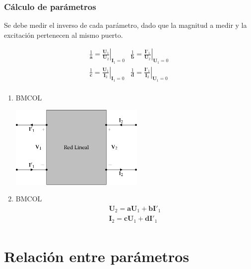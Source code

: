 \subsubsection{Cálculo de parámetros}
\label{sec:org67b01c0}
Se debe medir el inverso de cada parámetro, dado que la magnitud a medir y la excitación pertenecen al mismo puerto.

\renewcommand{\arraystretch}{3}
\[
  \begin{array}{cc}
    \frac{1}{\mathbf{a}} = \left.\frac{\mathbf{U}_1}{\mathbf{U}_2}\right\rvert_{\mathbf{I}_1 = 0} &
    \frac{1}{\mathbf{b}} = \left.\frac{\mathbf{I'}_1}{\mathbf{U}_2}\right\rvert_{\mathbf{U}_1 = 0}\\
    \frac{1}{\mathbf{c}} = \left.\frac{\mathbf{U}_1}{\mathbf{I}_2}\right\rvert_{\mathbf{I}_1 = 0} &
    \frac{1}{\mathbf{d}} = \left.\frac{\mathbf{I'}_1}{\mathbf{I}_2}\right\rvert_{\mathbf{U}_1 = 0}\\
  \end{array}
\]

\begin{enumerate}
\item \hfill{}\textsc{BMCOL}
\label{sec:org770263e}

\includegraphics[height=4cm]{../figs/cuadripolo_transmision_inversa.pdf}


\item \hfill{}\textsc{BMCOL}
\label{sec:orgc57f0bc}
\renewcommand{\arraystretch}{1}
\[
\begin{array}{l}
  \mathbf{U}_2 = \mathbf{a} \mathbf{U}_1 + \mathbf{b}\mathbf{I'}_1\\
  \mathbf{I}_2 = \mathbf{c} \mathbf{U}_1 + \mathbf{d} \mathbf{I'}_1\\
\end{array}
\]
\end{enumerate}


\section{Relación entre parámetros}
\label{sec:org2eae33c}

